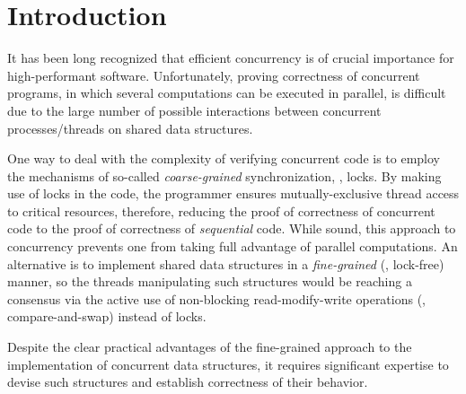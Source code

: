 \section{Introduction}
\label{sec:intro}

It has been long recognized that efficient concurrency is of crucial
importance for high-performant software. Unfortunately, proving
correctness of concurrent programs, in which several computations can
be executed in parallel, is difficult due to the large number of
possible interactions between concurrent processes/threads on shared
data structures.




One way to deal with the complexity of verifying concurrent code is to
employ the mechanisms of so-called \emph{coarse-grained}
synchronization, \ie, locks. By making use of locks in the code, the
programmer ensures mutually-exclusive thread access to critical
resources, therefore, reducing the proof of correctness of concurrent
code to the proof of correctness of \emph{sequential} code. While
sound, this approach to concurrency prevents one from taking full
advantage of parallel computations. An alternative is to implement
shared data structures in a \emph{fine-grained} (\ie, lock-free)
manner, so the threads manipulating such structures would be reaching
a consensus via the active use of non-blocking read-modify-write
operations (\eg, compare-and-swap) instead of locks.

Despite the clear practical advantages of the fine-grained approach to
the implementation of concurrent data structures, it requires
significant expertise to devise such structures and establish
correctness of their behavior.
%

